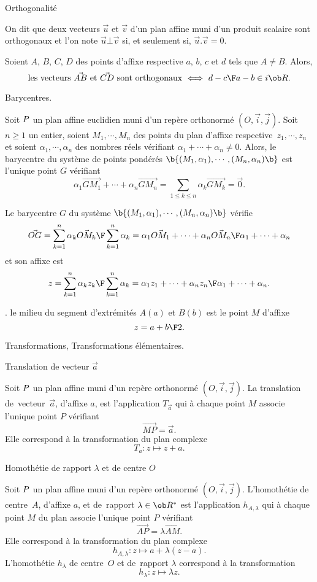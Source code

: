 \Concept [] Orthogonalit\'e 


\Definition [] On dit que deux vecteurs $\vec u$ et $\vec v$ d'un plan affine muni d'un produit scalaire sont orthogonaux et l'on note {$\vec u\bot\vec v$ si, et seulement si, $\vec u.\vec v=0$}. 
\bigskip

\noindent
Soient $A$, $B$, $C$, $D$ des points d'affixe respective $a$, $b$, $c$ et $d$ tels que $A\neq B$. Alors, 
$$
{\mbox{les vecteurs $\vec{AB}$ et $\vec{CD}$ sont orthogonaux}\ \Longleftrightarrow\ {d-c\F a-b}\in i\ob R}. 
$$

\Concept [] Barycentres.

\Definition [] Soit $\sc P$ un plan affine euclidien muni d'un rep\`ere orthonorm\'e $(O,\vec i,\vec j)$. \pn Soit $n\ge1$ un entier, soient $M_1,\cdots,M_n$ des points du plan d'affixe respective~$z_1,\cdots,z_n$ 
et soient $\alpha_1,\cdots,\alpha_n$ des nombres r\'eels v\'erifiant {$\alpha_1+\cdots+\alpha_n\neq0$}. 
Alors, le {barycentre} du syst\`eme de points pond\'er\'es {$\b\{(M_1,\alpha_1),\cdots,(M_n,\alpha_n)\b\}$} est l'unique point $G$ v\'erifiant 
$$
\alpha_1\vec{GM_1}+\cdots+\alpha_n\vec{GM_n}={\sum_{1\le k\le n}\alpha_k\vec{GM_k}=\vec0}.
$$


\Propriete [] Le barycentre $G$ du syst\`eme $\b\{(M_1,\alpha_1),\cdots,(M_n,\alpha_n)\b\}$ v\'erifie 
$$
{\vec{OG}={\sum_{k=1}^n\alpha_k\vec{OM_k}\F\sum_{k=1}^n\alpha_k}}={\alpha_1\vec{OM_1}+\cdots+\alpha_n\vec{OM_n}\F\alpha_1+\cdots+\alpha_n}
$$
et son affixe est 
$$
{z={\sum_{k=1}^n\alpha_kz_k\F\sum_{k=1}^n\alpha_k}}={\alpha_1z_1+\cdots+\alpha_nz_n\F\alpha_1+\cdots+\alpha_n}.
$$

\Exemple. le {milieu} du segment d'extr\'emit\'es $A(a)$ et $B(b)$ est le point $M$ d'affixe 
$$
{z={a+b\F2}}.
$$

\Subsection Transformations, Transformations \'el\'ementaires.

\Concept [] Translation de vecteur $\vec a$ 

\noindent
Soit $\sc P$ un plan affine muni d'un rep\`ere orthonorm\'e $(O,\vec i,\vec j)$. 
La translation de~vecteur~$\vec a$, d'affixe $a$, est l'application $T_{\vec a}$ qui \`a chaque point $M$ associe l'unique point $P$ v\'erifiant 
$$
\vec{MP}=\vec a.
$$
Elle correspond \`a la transformation du plan complexe 
$${T_a:z\mapsto z+a}. 
$$ 

\Concept [] Homoth\'etie de rapport $\lambda$ et de centre $O$

\noindent
Soit $\sc P$ un plan affine muni d'un rep\`ere orthonorm\'e $(O,\vec i,\vec j)$. 
L'homoth\'etie de centre~$A$, d'affixe $a$, et de~rapport $\lambda\in\ob R^*$ est l'application $h_{A,\lambda}$ qui \`a chaque point $M$ du plan associe l'unique point $P$ v\'erifiant 
$$
\vec{AP}=\lambda\vec{AM}.
$$
Elle correspond \`a la transformation du plan complexe 
$$
h_{A,\lambda}:z\mapsto a+\lambda(z-a).
$$
L'homoth\'etie $h_\lambda$ de centre~$O$ et de~rapport $\lambda$ correspond \`a la transformation 
$$
{h_\lambda:z\mapsto \lambda z}. 
$$ 

